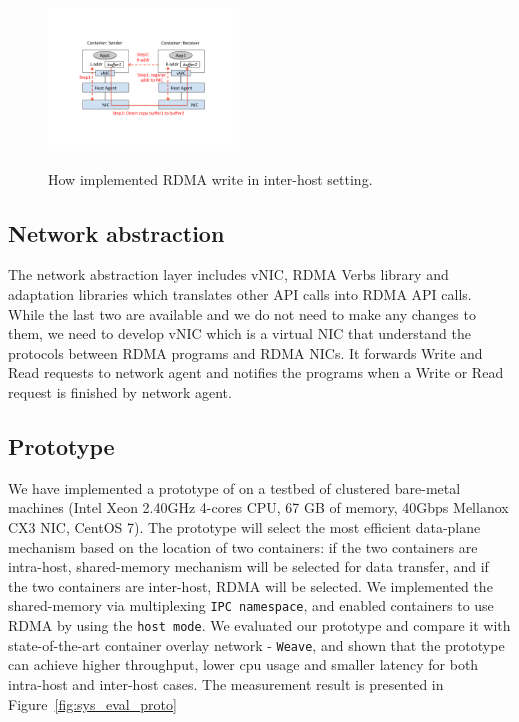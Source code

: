      \begin{figure}[th]
     \centering 
     \includegraphics[width=0.45\textwidth]{figures/system/sys_rdma_rdma.pdf}
     \label{fig:sys_rdma_rdma}
     \caption{How \sysname implemented RDMA write in inter-host setting.} 
     \end{figure}


\subsection{Network abstraction}
The network abstraction layer includes vNIC, RDMA Verbs library and adaptation
libraries which translates other API calls into RDMA API calls. 
While the last two are available and we do not need to make any changes to them,
we need to develop vNIC which is a virtual NIC that understand the protocols
between RDMA programs and RDMA NICs. It forwards Write and Read requests to 
network agent and notifies the programs when a Write or Read request is finished
by network agent. 

\subsection{Prototype}
We have implemented a prototype of \sysname on a testbed of clustered bare-metal
machines (Intel Xeon 2.40GHz 4-cores CPU, 67 GB of memory, 40Gbps Mellanox CX3
NIC, CentOS 7). The prototype will select the most
efficient data-plane mechanism based on the location of two containers: 
if the two containers are intra-host, shared-memory mechanism will be selected for data
transfer, and if the two containers are inter-host, RDMA will be selected.
We implemented the shared-memory via multiplexing \texttt{IPC namespace}, and enabled
containers to use RDMA by using the \texttt{host mode}.
We evaluated our prototype and compare it with state-of-the-art container overlay network
 - \texttt{Weave}, and shown that the prototype
can achieve higher throughput, lower cpu usage and smaller latency for both intra-host
and inter-host cases. The measurement result is presented in Figure~\ref{fig:sys_eval_proto}

